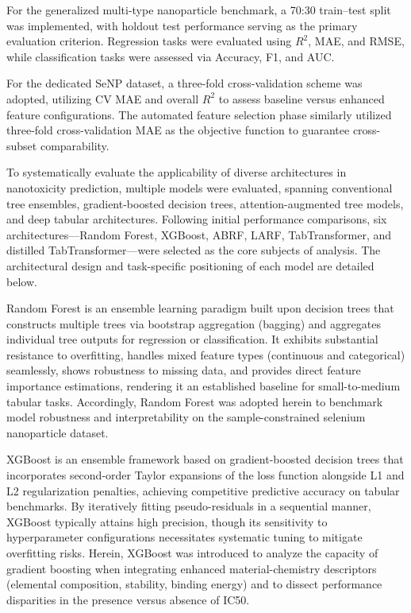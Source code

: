 For the generalized multi-type nanoparticle benchmark, a 70:30 train--test split was implemented, with holdout test performance serving as the primary evaluation criterion. Regression tasks were evaluated using $R^2$, MAE, and RMSE, while classification tasks were assessed via Accuracy, F1, and AUC.

For the dedicated SeNP dataset, a three-fold cross-validation scheme was adopted, utilizing CV MAE and overall $R^2$ to assess baseline versus enhanced feature configurations. The automated feature selection phase similarly utilized three-fold cross-validation MAE as the objective function to guarantee cross-subset comparability.

To systematically evaluate the applicability of diverse architectures in nanotoxicity prediction, multiple models were evaluated, spanning conventional tree ensembles, gradient-boosted decision trees, attention-augmented tree models, and deep tabular architectures.
Following initial performance comparisons, six architectures—Random Forest, XGBoost, ABRF, LARF, TabTransformer, and distilled TabTransformer—were selected as the core subjects of analysis.
The architectural design and task-specific positioning of each model are detailed below.

Random Forest is an ensemble learning paradigm built upon decision trees that constructs multiple trees via bootstrap aggregation (bagging) and aggregates individual tree outputs for regression or classification. It exhibits substantial resistance to overfitting, handles mixed feature types (continuous and categorical) seamlessly, shows robustness to missing data, and provides direct feature importance estimations, rendering it an established baseline for small-to-medium tabular tasks.
Accordingly, Random Forest was adopted herein to benchmark model robustness and interpretability on the sample-constrained selenium nanoparticle dataset.

XGBoost is an ensemble framework based on gradient-boosted decision trees that incorporates second-order Taylor expansions of the loss function alongside L1 and L2 regularization penalties, achieving competitive predictive accuracy on tabular benchmarks. By iteratively fitting pseudo-residuals in a sequential manner, XGBoost typically attains high precision, though its sensitivity to hyperparameter configurations necessitates systematic tuning to mitigate overfitting risks.
Herein, XGBoost was introduced to analyze the capacity of gradient boosting when integrating enhanced material-chemistry descriptors (elemental composition, stability, binding energy) and to dissect performance disparities in the presence versus absence of IC50.

